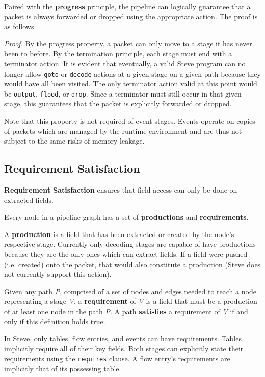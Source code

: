 Paired with the \textbf{progress} principle, the pipeline can logically guarantee that a packet is always forwarded or dropped using the appropriate action. The proof is as follows.

\textit{Proof.} By the progress property, a packet can only move to a stage it has never been to before. By the termination principle, each stage must end with a terminator action. It is evident that eventually, a valid Steve program can no longer allow \texttt{goto} or \texttt{decode} actions at a given stage on a given path because they would have all been visited. The only terminator action valid at this point would be \texttt{output}, \texttt{flood}, or \texttt{drop}. Since a terminator must still occur in that given stage, this guarantees that the packet is explicitly forwarded or dropped.

Note that this property is not required of event stages. Events operate on copies of packets which are managed by the runtime environment and are thus not subject to the same risks of memory leakage.

\subsection{Requirement Satisfaction} \label{requirements_guide}

\textbf{Requirement Satisfaction} ensures that field access can only be done on extracted fields. 

Every node in a pipeline graph has a set of \textbf{productions} and \textbf{requirements}.

A \textbf{production} is a field that has been extracted or created by the node's respective stage. Currently only decoding stages are capable of have productions because they are the only ones which can extract fields. If a field were pushed (i.e. created) onto the packet, that would also constitute a production (Steve does not currently support this action).

Given any path \textit{P}, comprised of a set of nodes and edges needed to reach a node representing a stage \textit{V}, a \textbf{requirement} of \textit{V} is a field that must be a production of at least one node in the path \textit{P}. A path \textbf{satisfies} a requirement of \textit{V} if and only if this definition holds true.

In Steve, only tables, flow entries, and events can have requirements. Tables implicitly require all of their key fields. Both stages can explicitly state their requirements using the \texttt{\color{blue}requires} clause. A flow entry's requirements are implicitly that of its possessing table.


